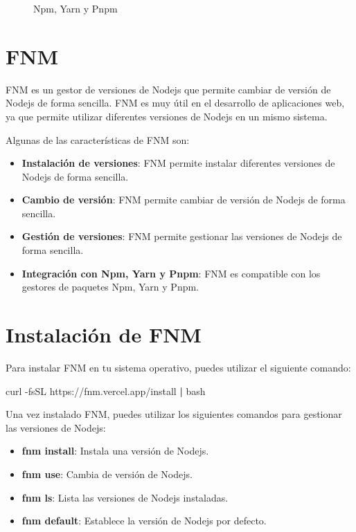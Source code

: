 \documentclass[
  a4paper,
  DIV=11,
  numbers=noendperiod,
  onepage,
  openany]{scrreprt}
\newenvironment{Shaded}{\begin{snugshade}}{\end{snugshade}}
\newcommand{\AttributeTok}[1]{\textcolor[rgb]{0.40,0.45,0.13}{#1}}
\newcommand{\ExtensionTok}[1]{\textcolor[rgb]{0.00,0.23,0.31}{#1}}
\newcommand{\FunctionTok}[1]{\textcolor[rgb]{0.28,0.35,0.67}{#1}}
\newcommand{\KeywordTok}[1]{\textcolor[rgb]{0.00,0.23,0.31}{\textbf{#1}}}
\newcommand{\NormalTok}[1]{\textcolor[rgb]{0.00,0.23,0.31}{#1}}
\begin{document}
\begin{tcolorbox}
\begin{figure}[H]
{}

\caption{Npm, Yarn y Pnpm}

\end{figure}%

\section{FNM}\label{fnm}

FNM es un gestor de versiones de Nodejs que permite cambiar de versión
de Nodejs de forma sencilla. FNM es muy útil en el desarrollo de
aplicaciones web, ya que permite utilizar diferentes versiones de Nodejs
en un mismo sistema.

Algunas de las características de FNM son:

\begin{itemize}
\item
  \textbf{Instalación de versiones}: FNM permite instalar diferentes
  versiones de Nodejs de forma sencilla.
\item
  \textbf{Cambio de versión}: FNM permite cambiar de versión de Nodejs
  de forma sencilla.
\item
  \textbf{Gestión de versiones}: FNM permite gestionar las versiones de
  Nodejs de forma sencilla.
\item
  \textbf{Integración con Npm, Yarn y Pnpm}: FNM es compatible con los
  gestores de paquetes Npm, Yarn y Pnpm.
\end{itemize}

\section{Instalación de FNM}\label{instalaciuxf3n-de-fnm}

Para instalar FNM en tu sistema operativo, puedes utilizar el siguiente
comando:

\begin{Shaded}
\begin{Highlighting}[]
\ExtensionTok{curl} \AttributeTok{{-}fsSL}\NormalTok{ https://fnm.vercel.app/install }\KeywordTok{|} \FunctionTok{bash}
\end{Highlighting}
\end{Shaded}

Una vez instalado FNM, puedes utilizar los siguientes comandos para
gestionar las versiones de Nodejs:

\begin{itemize}
\item
  \textbf{fnm install}: Instala una versión de Nodejs.
\item
  \textbf{fnm use}: Cambia de versión de Nodejs.
\item
  \textbf{fnm ls}: Lista las versiones de Nodejs instaladas.
\item
  \textbf{fnm default}: Establece la versión de Nodejs por defecto.
\end{itemize}


\end{tcolorbox}
\end{document}
